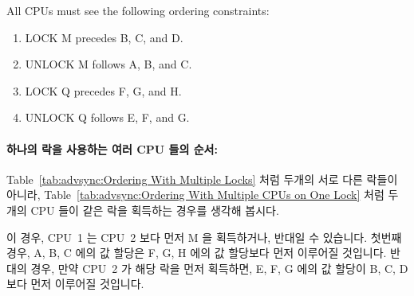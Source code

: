 \begin{enumerate}
{	All CPUs must see the following ordering constraints:
	\begin{enumerate}
	\item	LOCK M precedes B, C, and D.
	\item	UNLOCK M follows A, B, and C.
	\item	LOCK Q precedes F, G, and H.
	\item	UNLOCK Q follows E, F, and G.
	\end{enumerate}
	\fi
} \QuickQuizEnd

\paragraph{하나의 락을 사용하는 여러 CPU 들의 순서:}
Table~\ref{tab:advsync:Ordering With Multiple Locks} 처럼 두개의 서로 다른
락들이 아니라, Table~\ref{tab:advsync:Ordering With Multiple CPUs on One Lock}
처럼 두개의 CPU 들이 같은 락을 획득하는 경우를 생각해 봅시다.

\begin{table}[htbp]
\scriptsize{}
\caption{Ordering With Multiple CPUs on One Lock}
\label{tab:advsync:Ordering With Multiple CPUs on One Lock}
\end{table}

이 경우, CPU~1 는 CPU~2 보다 먼저 M 을 획득하거나, 반대일 수 있습니다.
첫번째 경우, A, B, C 에의 값 할당은 F, G, H 에의 값 할당보다 먼저 이루어질
것입니다.
반대의 경우, 만약 CPU~2 가 해당 락을 먼저 획득하면, E, F, G 에의 값 할당이 B,
C, D 보다 먼저 이루어질 것입니다.
\iffalse


\end{enumerate}
